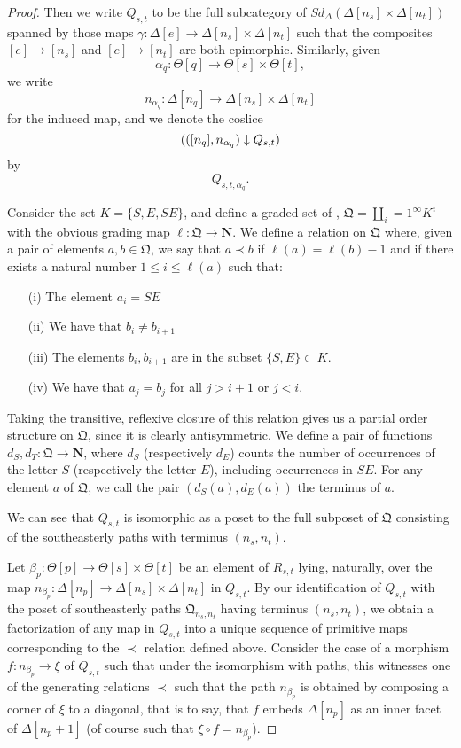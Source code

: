 \begin{proof}

Then we write \(Q_{s,t}\) to be the full subcategory of \(Sd_\Delta(\Delta[n_s]\times \Delta[n_t])\) spanned by those maps \(\gamma:\Delta[e]\to \Delta[n_s]\times \Delta[n_t]\) such that the composites \([e]\to [n_s]\) and \([e]\to [n_t]\) are both epimorphic.  Similarly, given \[\alpha_q:\Theta[q]\to \Theta[s]\times \Theta[t],\] we write \[n_{\alpha_q}:\Delta[n_q]\to \Delta[n_s]\times \Delta[n_t]\] for the induced map, and we denote the coslice \[{(([n_q],n_{\alpha_q})\downarrow Q_{s,t})}\] by \[Q_{s,t,\alpha_q}.\]  

Consider the set \(K=\{S,E,SE\}\), and define a graded set of , \(\mathfrak{Q}=\coprod_i=1^\infty K^i\) with the obvious grading map \(\ell:\mathfrak{Q}\to \mathbf{N}\).  We define a relation on \(\mathfrak{Q}\) where, given a pair of elements \(a,b\in \mathfrak{Q}\), we say that \(a\prec b\) if \(\ell(a)=\ell(b)-1\) and if there exists a natural number \(1\leq i \leq \ell(a)\) such that:
\begin{enumerate}
\item[(i)] The element \(a_i = SE\)
\item[(ii)] We have that \(b_i \neq b_{i+1}\)
\item[(iii)] The elements \(b_i,b_{i+1}\) are in the subset \(\{S,E\}\subset K\).
\item[(iv)] We have that \(a_j=b_j\) for all \(j > i+1\) or \(j<i\).  
\end{enumerate}
Taking the transitive, reflexive closure of this relation gives us a partial order structure on \(\mathfrak{Q}\), since it is clearly antisymmetric.
We define a pair of functions \(d_S,d_T:\mathfrak{Q}\to \mathbf{N}\), where \(d_S\) (respectively \(d_E\)) counts the number of occurrences of the letter \(S\) (respectively the letter \(E\)), including occurrences in \(SE\). For any element \(a\) of \(\mathfrak{Q}\), we call the pair \((d_S(a),d_E(a))\) the terminus of \(a\).  

We can see that \(Q_{s,t}\)  is isomorphic as a poset to the full subposet of \(\mathfrak{Q}\) consisting of the southeasterly paths with terminus \((n_s, n_t)\).  

Let \(\beta_p:\Theta[p] \to \Theta[s] \times \Theta[t]\) be an element of \(R_{s,t}\) lying, naturally, over the map \(n_{\beta_p}:\Delta[n_p]\to \Delta[n_s]\times \Delta[n_t]\) in \(Q_{s,t}\).  By our identification of \(Q_{s,t}\) with the poset of southeasterly paths \(\mathfrak{Q}_{n_s,n_t}\) having terminus \((n_s,n_t)\), we obtain a factorization of any map in \(Q_{s,t}\) into a unique sequence of primitive maps corresponding to the \(\prec\) relation defined above.  Consider the case of a morphism \(f:n_{\beta_p} \to \xi\) of \(Q_{s,t}\) such that under the isomorphism with paths, this witnesses one of the generating relations \(\prec\) such that the path \(n_{\beta_p}\) is obtained by composing a corner of \(\xi\) to a diagonal, that is to say, that \(f\) embeds \(\Delta[n_p]\) as an inner facet of \(\Delta[n_p+1]\) (of course such that \(\xi \circ f = n_{\beta_p}\)).


\end{proof}
